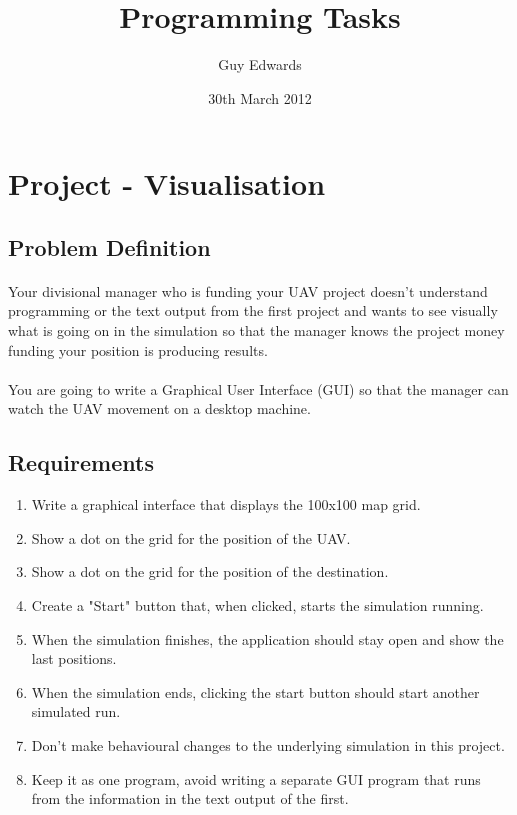 \documentclass[11pt]{book}
\title{\textbf{Programming Tasks}}
\author{Guy Edwards}
\date{30th March 2012}
\begin{document}
\section{Project - Visualisation}

\subsection{Problem Definition}

\paragraph{} Your divisional manager who is funding your UAV project doesn't
understand programming or the text output from the first project and wants to
see visually what is going on in the simulation so that the manager knows the
project money funding your position is producing results.

\paragraph{} You are going to write a Graphical User Interface (GUI) so that
the manager can watch the UAV movement on a desktop machine.

\subsection{Requirements}

\begin{enumerate}
\item Write a graphical interface that displays the 100x100 map grid.
\item Show a dot on the grid for the position of the UAV.
\item Show a dot on the grid for the position of the destination.
\item Create a "Start" button that, when clicked, starts the simulation running.
\item When the simulation finishes, the application should stay open and show the last positions.
\item When the simulation ends, clicking the start button should start another simulated run.
\item Don't make behavioural changes to the underlying simulation in this project.
\item Keep it as one program, avoid writing a separate GUI program that runs from the information in the text output of the first.
\end{enumerate}
\end{document}
